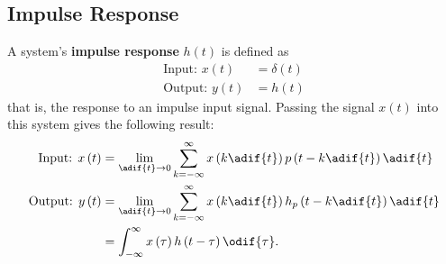 \documentclass{article}
\begin{document}
\subsection{Impulse Response}
A system's \textbf{impulse response} \(h\left( t \right)\) is defined
as
\begin{align*}
    \text{Input: } x\left( t \right)  & = \delta\left( t \right) \\
    \text{Output: } y\left( t \right) & = h\left( t \right)
\end{align*}
that is, the response to an impulse input signal.
Passing the signal \(x\left( t \right)\) into this system gives the
following result:
\begin{align*}
    \text{Input: } x\left( t \right)  & = \lim_{\adif{t} \to 0} \sum_{k = -\infty}^\infty x\left( k \adif{t} \right) p\left( t - k \adif{t} \right) \adif{t}   \\
    \text{Output: } y\left( t \right) & = \lim_{\adif{t} \to 0} \sum_{k = -\infty}^\infty x\left( k \adif{t} \right) h_p\left( t - k \adif{t} \right) \adif{t} \\
                                      & = \int_{-\infty}^\infty x\left( \tau \right) h\left( t - \tau \right) \odif{\tau}.
\end{align*}
\end{document}
